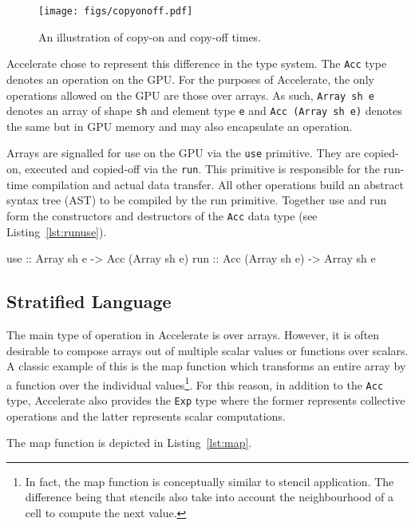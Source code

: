 \documentclass[12pt,a4paper,oneside]{scrbook}
\begin{document}
\begin{figure}
  \texttt{[image: figs/copyonoff.pdf]}
  \caption{An illustration of copy-on and copy-off times.}
  \label{fig:copyonoff}
\end{figure}

Accelerate chose to represent this difference in the type system. The
\texttt{Acc} type denotes an operation on the GPU. For the purposes of
Accelerate, the only operations allowed on the GPU are those over arrays. As
such, \texttt{Array sh e} denotes an array of shape \texttt{sh} and element type
\texttt{e} and \texttt{Acc (Array sh e)} denotes the same but in GPU memory and
may also encapsulate an operation.

Arrays are signalled for use on the GPU via the \texttt{use} primitive.  They
are copied-on, executed and copied-off via the \texttt{run}. This primitive is
responsible for the run-time compilation and actual data transfer. All other
operations build an abstract syntax tree (AST) to be compiled by the run
primitive. Together use and run form the constructors and destructors of the
\texttt{Acc} data type (see Listing~\ref{lst:runuse}).

\begin{hflisting}[label={lst:runuse}, caption=The basic constructors and
  destructors for moving arrays too and from the GPU in Accelerate.]
use :: Array sh e -> Acc (Array sh e)
run :: Acc (Array sh e) -> Array sh e
\end{hflisting}

\subsection{Stratified Language}

The main type of operation in Accelerate is over arrays. However, it is often
desirable to compose arrays out of multiple scalar values or functions over
scalars. A classic example of this is the map function which transforms an
entire array by a function over the individual values\footnote{In fact, the map
  function is conceptually similar to stencil application. The difference being
  that stencils also take into account the neighbourhood of a cell to compute
  the next value.}. For this reason, in addition to the \texttt{Acc} type,
Accelerate also provides the \texttt{Exp} type where the former represents
collective operations and the latter represents scalar computations.

The map function is depicted in Listing~\ref{lst:map}.
\end{document}
